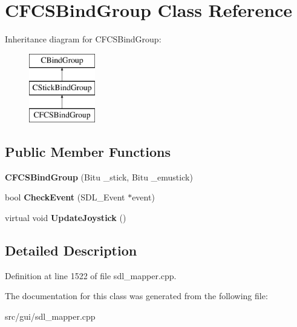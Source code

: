 \hypertarget{classCFCSBindGroup}{\section{C\-F\-C\-S\-Bind\-Group Class Reference}
\label{classCFCSBindGroup}
}
Inheritance diagram for C\-F\-C\-S\-Bind\-Group\-:\begin{figure}[H]
\begin{center}
\leavevmode
\includegraphics[height=3.000000cm]{classCFCSBindGroup}
\end{center}
\end{figure}
\subsection*{Public Member Functions}
\begin{DoxyCompactItemize}
\item 
\hypertarget{classCFCSBindGroup_a366a39efa7db658cfdec657580818264}{{\bfseries C\-F\-C\-S\-Bind\-Group} (Bitu \-\_\-stick, Bitu \-\_\-emustick)}\label{classCFCSBindGroup_a366a39efa7db658cfdec657580818264}

\item 
\hypertarget{classCFCSBindGroup_a25a662090cb26b626cac51449c94e3af}{bool {\bfseries Check\-Event} (S\-D\-L\-\_\-\-Event $\ast$event)}\label{classCFCSBindGroup_a25a662090cb26b626cac51449c94e3af}

\item 
\hypertarget{classCFCSBindGroup_a19be69d6c38cc544b2b4517eeab84fef}{virtual void {\bfseries Update\-Joystick} ()}\label{classCFCSBindGroup_a19be69d6c38cc544b2b4517eeab84fef}

\end{DoxyCompactItemize}


\subsection{Detailed Description}


Definition at line 1522 of file sdl\-\_\-mapper.\-cpp.



The documentation for this class was generated from the following file\-:\begin{DoxyCompactItemize}
\item 
src/gui/sdl\-\_\-mapper.\-cpp\end{DoxyCompactItemize}
